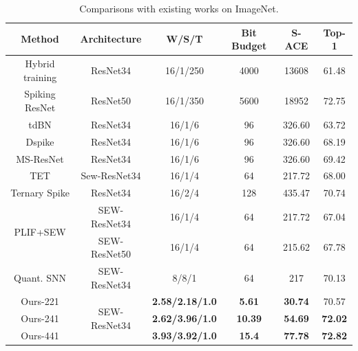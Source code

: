\begin{table}[t]
\centering
\caption{Comparisons with existing works on ImageNet.}
\label{tab:comparison on imagenet}
\begin{adjustbox}{max width=0.48\textwidth}
\begin{threeparttable}
\begin{tabular}{cccccc}
\toprule
\textbf{Method} & \textbf{Architecture}         & \textbf{W/S/T}         & \textbf{Bit Budget} & \textbf{S-ACE} & \textbf{Top-1} \\ \midrule
Hybrid training \cite{rathi2020enabling} & ResNet34                      & 16/1/250               & 4000                & 13608          & 61.48          \\
Spiking ResNet \cite{hu2021spiking}  & ResNet50                      & 16/1/350               & 5600                & 18952          & 72.75          \\
tdBN \cite{zheng2021going}           & ResNet34                      & 16/1/6                 & 96                  & 326.60         & 63.72          \\
Dspike \cite{li2021differentiable}         & ResNet34                      & 16/1/6                 & 96                  & 326.60         & 68.19          \\
MS-ResNet \cite{hu2024advancing}       & ResNet34                      & 16/1/6                 & 96                  & 326.60         & 69.42          \\ \midrule
TET \cite{deng2021temporal}             & Sew-ResNet34                  & 16/1/4                 & 64                  & 217.72         & 68.00          \\
Ternary Spike \cite{guo2024ternary}   & ResNet34                      & 16/2/4                 & 128                 & 435.47         & 70.74          \\ 
\multirow{2}{*}{PLIF+SEW \cite{fang2021deep}}     & SEW-ResNet34                  & 16/1/4                 & 64                  & 217.72         & 67.04          \\ 
                & SEW-ResNet50                  & 16/1/4                 & 64                  & 215.62         & 67.78          \\ 
Quant. SNN \cite{shen2024conventional}      & SEW-ResNet34                  & 8/8/1                  & 64                  & 217            & 70.13          \\ \midrule
Ours-221        & \multirow{3}{*}{SEW-ResNet34} & \textbf{2.58/2.18/1.0} & \textbf{5.61}      & \textbf{30.74} & 70.57 \\
Ours-241        &                               & \textbf{2.62/3.96/1.0} & \textbf{10.39}      & \textbf{54.69} & \textbf{72.02} \\
Ours-441        &                               & \textbf{3.93/3.92/1.0} & \textbf{15.4}      & \textbf{77.78} & \textbf{72.82} \\ \bottomrule
\end{tabular}


\end{threeparttable}
\end{adjustbox}
\end{table}
